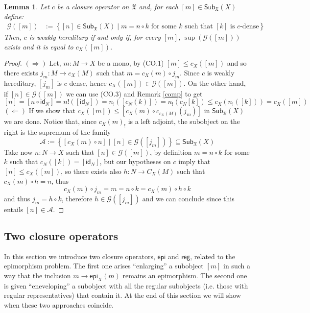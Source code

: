 \documentclass[12pt]{article}
\newtheorem{lemma}{Lemma}[section]
\theoremstyle{definition}
\def\X{\mathfrak X}
\numberwithin{equation}{section}
\newcommand{\catname}[1]{\mathbf{#1}}
\newcommand{\sub}[1]{\mathsf{Sub}_{\catname{#1}}}
\newcommand{\id}[1]{\mathsf{id}_{#1}}
\def\epi{\mathsf{epi}}
\def\reg{\mathsf{reg}}
\begin{document}
\begin{lemma}\label{char_epi}
	Let $c$ be a closure operator on $\X$ and, for each $[m]\in \sub{\X}(X)$ define:
	\begin{align*}
	\mathcal{G}([m])&:=\left\{[n]\in  \sub{\X}(X) \mid m=n\circ k \text{ for some } k \text{ such that } [k] \text{ is }  c\text{-dense}\right\}
	\end{align*}
	Then, $c$ is weakly hereditary if and only if, for every $[m]$, $\sup(\mathcal{G}([m]))$ exists and it is equal to $c_X([m]).$
\end{lemma}
\begin{proof}
$(\Rightarrow)$ Let, $m:M\rightarrow X$ be a mono, by (CO.1) $[m]\leq c_X([m])$ and so there exists $j_m:M\rightarrow c_X(M)$ such that $m=c_X(m)\circ j_m$. Since $c$ is weakly hereditary, $[j_m]$ is $c$-dense, hence $c_X([m])\in \mathcal{G}([m])$. On the other hand, if $[n]\in \mathcal{G}([m])$ we can use (CO.3) and Remark \ref{comp} to get
\[[n]=[n\circ \id{N}]=n!([\id{N}])=n_!([c_N(k)])=n_!(c_N[k])\leq c_{X}(n_!([k]))=c_X([m])\]
\noindent
$(\Leftarrow)$ If we show that $c_X([m])\leq[c_X(m)\circ c_{c_X(M)}(j_m)]$ in $\sub{\X}(X)$ we are done. Notice that, since $c_{X}(m)_!$ is a left adjoint, the subobject on the right is the supremum of the family
\[\mathcal{A}:=\left \{[c_X(m)\circ n] \mid [n] \in \mathcal{G}([j_m]) \right \}\subseteq \sub{\X}(X)\]
Take now $n:N\rightarrow X$ such that $[n]\in \mathcal{G}([m])$, by definition $m=n\circ k$ for some $k$ such that $c_N([k])=[\id{N}]$, but our hypotheses on $c$ imply that $[n]\leq c_X([m])$, so there exists also $h:N\rightarrow C_X(M)$ such that $c_X(m)\circ h=n$, thus
\[c_X(m)\circ j_m=m=n\circ k=c_X(m)\circ h\circ k\]
and thus $j_m=h\circ k$, therefore $h\in \mathcal{G}([j_m])$ and we can conclude since this entails $[n]\in \mathcal{A}$. 
\end{proof}

\subsection{Two closure operators} 
In this section we introduce two closure operators, $\epi$ and $\reg$, related to the epimorphism problem. The first one arises ``enlarging'' a subobject $[m]$ in such a way that the inclusion $m\rightarrow \epi_{X}(m)$ remains an epimorphism. The second one is given ``eneveloping'' a subobject with all the regular subobjects (i.e. those with regular representatives) that contain it. At the end of this section we will show when these two approaches coincide.
\end{document}
